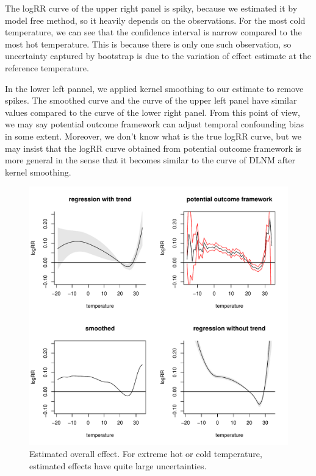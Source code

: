 \documentclass[12pt]{article}
\begin{document}
The logRR curve of the upper right panel is spiky,
because we estimated it by model free method, so it heavily depends on the observations.
For the most cold temperature, 
we can see that the confidence interval is narrow compared to the most hot temperature.
This is because there is only one such observation,
so uncertainty captured by bootstrap is due to the variation of effect estimate at the reference temperature.

In the lower left pannel, we applied kernel smoothing to our estimate to remove spikes.
The smoothed curve and the curve of the upper left panel have similar values 
compared to the curve of the lower right panel.
From this point of view, 
we may say potential outcome framework can adjust temporal confounding bias in some extent.
Moreover, we don't know what is the true logRR curve,
but we may insist that the logRR curve obtained from potential outcome framework is more general
in the sense that it becomes similar to the curve of DLNM after kernel smoothing.

\begin{figure}
	\includegraphics[width = \textwidth]{figures/main1.pdf}
	\caption[Figure 1.]{Estimated overall effect. 
	For extreme hot or cold temperature, estimated effects have quite large uncertainties.}
\end{figure}
\end{document}
